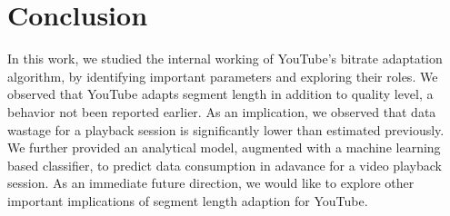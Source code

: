 \section{Conclusion}
\label{chap03sec:conclusion}

In this work, we studied the internal working of YouTube's bitrate adaptation algorithm, by identifying important parameters and exploring their roles.
We observed that YouTube adapts segment length in addition to quality level, a behavior not been reported earlier.
As an implication, we observed that data wastage for a playback session is significantly lower than estimated previously.
We further provided an analytical model, augmented with a machine learning based classifier, to predict data consumption in adavance for a video playback session.
As an immediate future direction, we would like to explore other important implications of segment length adaption for YouTube.

